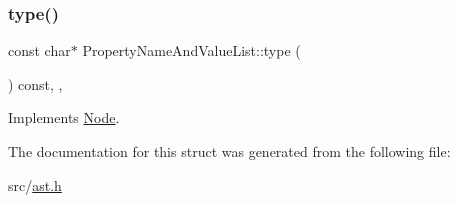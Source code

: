 \subsubsection{\texorpdfstring{type()}{type()}}
{\footnotesize\ttfamily const char$\ast$ Property\+Name\+And\+Value\+List\+::type (\begin{DoxyParamCaption}{ }\end{DoxyParamCaption}) const\hspace{0.3cm}{\ttfamily [inline]}, {\ttfamily [override]}, {\ttfamily [virtual]}}



Implements \hyperlink{struct_node_a82f29420d0a38efcc370352528e94e9b}{Node}.



The documentation for this struct was generated from the following file\+:\begin{DoxyCompactItemize}
\item 
src/\hyperlink{ast_8h}{ast.\+h}\end{DoxyCompactItemize}

